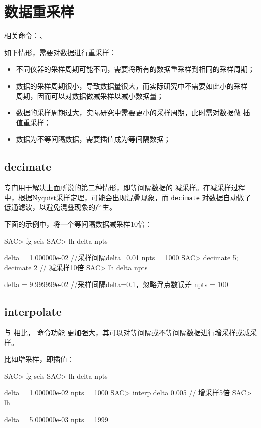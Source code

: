 \section{数据重采样}
相关命令：、

如下情形，需要对数据进行重采样：
\begin{itemize}
\item 不同仪器的采样周期可能不同，需要将所有的数据重采样到相同的采样周期；
\item 数据的采样周期很小，导致数据量很大，而实际研究中不需要如此小的采样
    周期，因而可以对数据做减采样以减小数据量；
\item 数据的采样周期过大，实际研究中需要更小的采样周期，此时需对数据做
    插值重采样；
\item 数据为不等间隔数据，需要插值成为等间隔数据；
\end{itemize}

\subsection{decimate}
 专门用于解决上面所说的第二种情形，即等间隔数据的
减采样。在减采样过程中，根据Nyquist采样定理，可能会出现混叠现象，而 
\texttt{decimate} 对数据自动做了低通滤波，以避免混叠现象的产生。

下面的示例中，将一个等间隔数据减采样10倍：
\begin{SACCode}
SAC> fg seis
SAC> lh delta npts

     delta = 1.000000e-02       //采样间隔delta=0.01
      npts = 1000
SAC> decimate 5; decimate 2     // 减采样10倍
SAC> lh delta npts

     delta = 9.999999e-02       //采样间隔delta=0.1，忽略浮点数误差
      npts = 100
\end{SACCode}

\subsection{interpolate}
与  相比， 命令功能
更加强大，其可以对等间隔或不等间隔数据进行增采样或减采样。

比如增采样，即插值：
\begin{SACCode}
SAC> fg seis
SAC> lh delta npts

     delta = 1.000000e-02
     npts = 1000
SAC> interp delta 0.005         // 增采样5倍
SAC> lh

     delta = 5.000000e-03
     npts = 1999
\end{SACCode}

